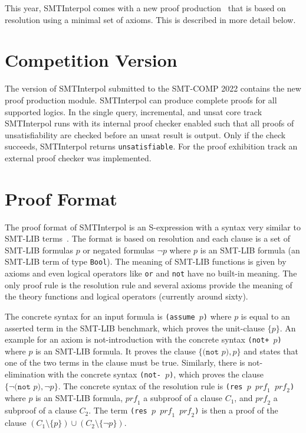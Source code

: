 \documentclass[a4paper]{easychair}
\newcommand\SI{SMTInterpol\xspace}
\newcommand\smtlib[1]{\texttt{#1}}
\newcommand\prf{\mathit{prf}}
\begin{document}
This year, \SI comes with a new proof production~\cite{DBLP:conf/smt/HoenickeS22} that is based on resolution using a minimal set of axioms.  This is described in more detail below.

\section*{Competition Version}
The version of \SI submitted to the SMT-COMP 2022 contains the new proof production module.
\SI can produce complete proofs for all supported logics.
In the single query, incremental, and unsat core track \SI runs with its internal proof checker enabled such that all proofs of unsatisfiability are checked before an unsat result is output.
Only if the check succeeds, \SI returns \texttt{unsatisfiable}.
For the proof exhibition track an external proof checker was implemented.

\section*{Proof Format}

The proof format of \SI is an S-expression with a syntax very similar to SMT-LIB terms~\cite{DBLP:conf/smt/HoenickeS22}.
The format is based on resolution and each clause is a set of SMT-LIB formulas $p$ or negated formulas $\lnot p$ where $p$ is an SMT-LIB formula (an SMT-LIB term of type \smtlib{Bool}).
The meaning of SMT-LIB functions is given by axioms and even logical operators like \smtlib{or} and \smtlib{not} have no built-in meaning.
The only proof rule is the resolution rule and several axioms provide the meaning of the theory functions and logical operators (currently around sixty).

The concrete syntax for an input formula is \smtlib{(assume $p$)} where $p$ is equal to an asserted term in the SMT-LIB benchmark, which proves the unit-clause $\{ p \}$.
An example for an axiom is not-introduction with the concrete syntax \smtlib{(not+ $p$)} where $p$ is an SMT-LIB formula.
It proves the clause $\{ \smtlib{(not $p$)}, p \}$ and states that one of the two terms in the clause must be true.
Similarly, there is not-elimination with the concrete syntax \smtlib{(not- $p$)}, which proves the clause $\{ \lnot \smtlib{(not $p$)}, \lnot \smtlib{$p$}\}$.
The concrete syntax of the resolution rule is \smtlib{(res $p$ $\prf_1$ $\prf_2$)} where $p$ is an SMT-LIB formula, $\prf_1$ a subproof of a clause $C_1$, and $\prf_2$ a subproof of a clause $C_2$.
The term \smtlib{(res $p$ $\prf_1$ $\prf_2$)} is then a proof of the clause $(C_1\setminus\{p\}) \cup (C_2\setminus\{\lnot p\})$.
\end{document}
